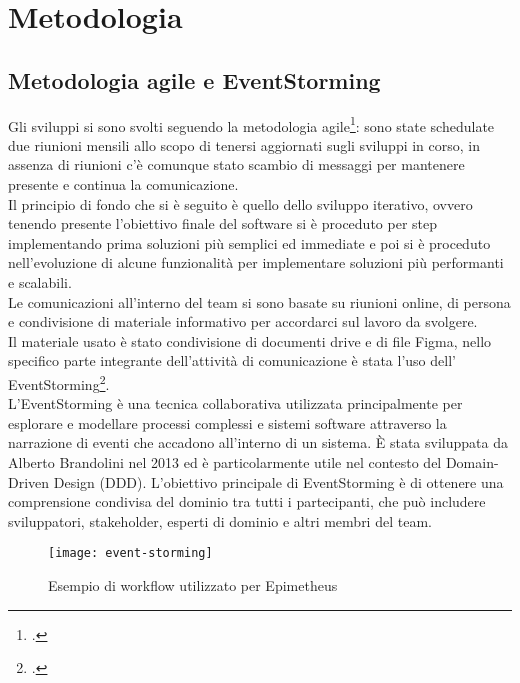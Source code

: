 \chapter{Metodologia}
\label{cap:metodologia}


\section{Metodologia agile e EventStorming}
\label{sec:metodologia-agile}

Gli sviluppi si sono svolti seguendo la metodologia agile\footcite{site:agile-manifesto}: sono state schedulate due riunioni mensili allo scopo di tenersi aggiornati sugli sviluppi in corso, in assenza di riunioni c'è comunque stato scambio di messaggi per mantenere presente e continua la comunicazione.\\
Il principio di fondo che si è seguito è quello dello sviluppo iterativo, ovvero tenendo presente l'obiettivo finale del software si è proceduto per step implementando prima soluzioni più semplici ed immediate e poi si è proceduto nell'evoluzione di alcune funzionalità per implementare soluzioni più performanti e scalabili. \\

Le comunicazioni all'interno del team si sono basate su riunioni online, di persona e condivisione di materiale informativo per accordarci sul lavoro da svolgere.\\
Il materiale usato è stato condivisione di documenti drive e di file Figma, nello specifico parte integrante dell'attività di comunicazione è stata l'uso dell' EventStorming\footcite{womak:event-storming}.\\
L'EventStorming è una tecnica collaborativa utilizzata principalmente per esplorare e modellare processi complessi e sistemi software attraverso la narrazione di eventi che accadono all'interno di un sistema. È stata sviluppata da Alberto Brandolini nel 2013 ed è particolarmente utile nel contesto del Domain-Driven Design (DDD). L'obiettivo principale di EventStorming è di ottenere una comprensione condivisa del dominio tra tutti i partecipanti, che può includere sviluppatori, stakeholder, esperti di dominio e altri membri del team.

\begin{figure}[!ht] 
    \centering 
    \texttt{[image: event-storming]} 
    \caption{Esempio di workflow utilizzato per Epimetheus}
\end{figure}


